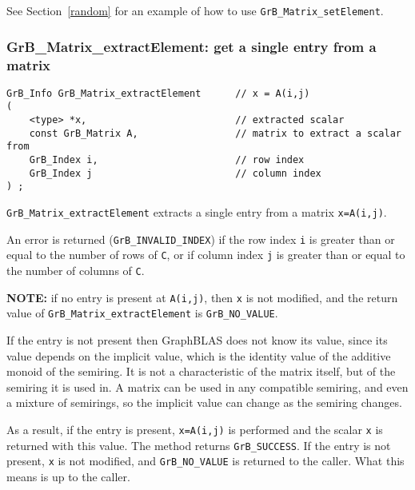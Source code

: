 \documentclass[12pt]{article}
\begin{document}
See Section~\ref{random} for an example of how to use
\verb'GrB_Matrix_setElement'.

\subsubsection{{\sf GrB\_Matrix\_extractElement:} get a single entry from a matrix}
\label{matrix_extractElement}

\begin{mdframed}[userdefinedwidth=6in]
{\footnotesize
\begin{verbatim}
GrB_Info GrB_Matrix_extractElement      // x = A(i,j)
(
    <type> *x,                          // extracted scalar
    const GrB_Matrix A,                 // matrix to extract a scalar from
    GrB_Index i,                        // row index
    GrB_Index j                         // column index
) ;
\end{verbatim} } \end{mdframed}

\verb'GrB_Matrix_extractElement' extracts a single entry from a matrix
\verb'x=A(i,j)'.

An error is returned (\verb'GrB_INVALID_INDEX') if the row index \verb'i' is
greater than or equal to the number of rows of \verb'C', or if column index
\verb'j' is greater than or equal to the number of columns of \verb'C'.

{\bf NOTE: }  if no entry is present at \verb'A(i,j)', then
\verb'x' is not modified, and the return value of
\verb'GrB_Matrix_extractElement' is \verb'GrB_NO_VALUE'.

If the entry is not present then GraphBLAS does not know its value, since its
value depends on the implicit value, which is the identity value of the
additive monoid of the semiring.  It is not a characteristic of the matrix
itself, but of the semiring it is used in.  A matrix can be used in any
compatible semiring, and even a mixture of semirings, so the implicit value can
change as the semiring changes.

As a result, if the entry is present, \verb'x=A(i,j)' is performed and the
scalar \verb'x' is returned with this value.  The method returns
\verb'GrB_SUCCESS'.  If the entry is not present, \verb'x' is not modified, and
\verb'GrB_NO_VALUE' is returned to the caller.  What this means is up to the
caller.
\end{document}
